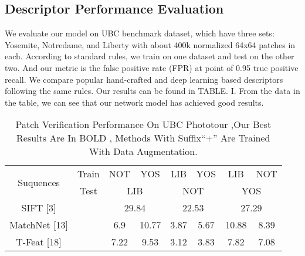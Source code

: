 \documentclass[letterpaper, 10 pt, conference]{ieeeconf}  %
\begin{document}
\subsection{Descriptor Performance Evaluation}
We evaluate our model on UBC benchmark dataset, which have three sets: Yosemite, Notredame, and Liberty with about 400k normalized 64x64 patches in each. According to standard rules, we train on one dataset and test on the other two. And our metric is the false positive rate (FPR) at point of 0.95 true positive recall. We compare popular hand-crafted and deep learning based descriptors following the same rules. Our results can be found in TABLE. I. From the data in the table, we can see that our network model has achieved good results. 
\begin{table}[h]
\centering
\scriptsize
\caption{Patch Verification Performance On UBC Phototour ,Our Best Results Are In BOLD , Methods With Suffix“+” Are Trained With Data Augmentation.}
\label{table_example}
\begin{center}
\begin{tabular}{cccccccc}
\toprule
\midrule
\multirow{2}{*}{Suquences} & \multicolumn{1}{c}{Train} & \multicolumn{1}{c}{NOT} & \multicolumn{1}{c}{YOS}  & \multicolumn{1}{c}{LIB}  & \multicolumn{1}{c}{YOS}  & \multicolumn{1}{c}{LIB}   & \multicolumn{1}{c}{NOT}  \\
  \cline{3-8}
                                            & \multicolumn{1}{c}{Test}                                     & \multicolumn{2}{c}{LIB}                                                   & \multicolumn{2}{c}{NOT}                                         & \multicolumn{2}{c}{YOS}                       \\
  \cline{1-8}
\multirow{1}{*}{SIFT [3]}     & \multicolumn{1}{c}{ }                                         & \multicolumn{2}{c}{29.84}                                                 & \multicolumn{2}{c}{22.53}                                         & \multicolumn{2}{c}{27.29}  \\
  \cline{3-8}
\multirow{1}{*}{MatchNet [13]}   & \multicolumn{1}{c}{ } & \multicolumn{1}{c}{6.9} & \multicolumn{1}{c}{10.77} & \multicolumn{1}{c}{3.87}  & \multicolumn{1}{c}{5.67}  & \multicolumn{1}{c}{10.88}  & \multicolumn{1}{c}{8.39}  \\
  \cline{3-8}
\multirow{1}{*}{T-Feat [18]} & \multicolumn{1}{c}{}  & \multicolumn{1}{c}{7.22} & \multicolumn{1}{c}{9.53} & \multicolumn{1}{c}{3.12}  & \multicolumn{1}{c}{3.83}  & \multicolumn{1}{c}{7.82}  & \multicolumn{1}{c}{7.08}  \\

\end{tabular}
\end{center}
\end{table}
\end{document}
